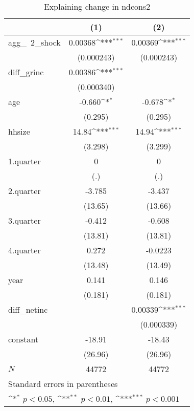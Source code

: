 \begin{table}[htbp]\centering
\def\sym#1{\ifmmode^{#1}\else\(^{#1}\)\fi}
\caption{\label{ndcons2\_deltacons} Explaining change in ndcons2}
\begin{tabular}{l*{2}{c}}
\hline\hline
            &\multicolumn{1}{c}{(1)}         &\multicolumn{1}{c}{(2)}         \\
\hline
agg\_~2\_shock&     0.00368\sym{***}&     0.00369\sym{***}\\
            &  (0.000243)         &  (0.000243)         \\
diff\_grinc  &     0.00386\sym{***}&                     \\
            &  (0.000340)         &                     \\
age         &      -0.660\sym{*}  &      -0.678\sym{*}  \\
            &     (0.295)         &     (0.295)         \\
hhsize      &       14.84\sym{***}&       14.94\sym{***}\\
            &     (3.298)         &     (3.299)         \\
1.quarter   &           0         &           0         \\
            &         (.)         &         (.)         \\
2.quarter   &      -3.785         &      -3.437         \\
            &     (13.65)         &     (13.66)         \\
3.quarter   &      -0.412         &      -0.608         \\
            &     (13.81)         &     (13.81)         \\
4.quarter   &       0.272         &     -0.0223         \\
            &     (13.48)         &     (13.49)         \\
year        &       0.141         &       0.146         \\
            &     (0.181)         &     (0.181)         \\
diff\_netinc &                     &     0.00339\sym{***}\\
            &                     &  (0.000339)         \\
constant    &      -18.91         &      -18.43         \\
            &     (26.96)         &     (26.96)         \\
\hline
\(N\)       &       44772         &       44772         \\
\hline\hline
\multicolumn{3}{l}{\footnotesize Standard errors in parentheses}\\
\multicolumn{3}{l}{\footnotesize \sym{*} \(p<0.05\), \sym{**} \(p<0.01\), \sym{***} \(p<0.001\)}\\
\end{tabular}
\end{table}

